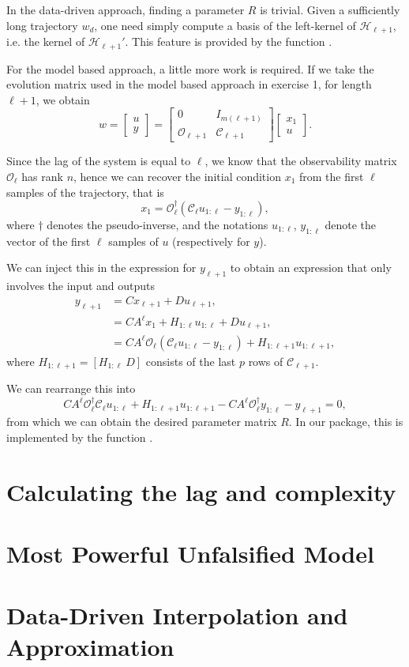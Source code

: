 \documentclass[11pt]{article}
\begin{document}
In the data-driven approach, finding a parameter $R$ is trivial. Given a sufficiently long trajectory $w_d$, one need simply compute a basis of the left-kernel of $\mathscr{H}_{\ell+1}$, i.e. the kernel of $\mathscr{H}_{\ell+1}'$. This feature is provided by the function .

For the model based approach, a little more work is required. If we take the evolution matrix used in the model based approach in exercise 1, for length $\ell + 1$, we obtain
$$ w = \begin{bmatrix}
  u \\
  y
\end{bmatrix} = \begin{bmatrix}
  0 & I_{m(\ell+1)} \\
  \mathscr{O}_{\ell+1} & \mathscr{C}_{\ell+1}
\end{bmatrix} \begin{bmatrix}
  x_1 \\
  u
\end{bmatrix}.$$

Since the lag of the system is equal to $\ell$, we know that the observability matrix $\mathscr{O}_\ell$ has rank $n$, hence we can recover the initial condition $x_1$ from the first $\ell$ samples of the trajectory, that is
$$ x_1 = \mathscr{O}_\ell^\dagger (\mathscr{C}_\ell u_{1:\ell} - y_{1:\ell}), $$
where $\dagger$ denotes the pseudo-inverse, and the notations $u_{1:\ell}$, $y_{1:\ell}$ denote the vector of the first $\ell$ samples of $u$ (respectively for $y$). 

We can inject this in the expression for $y_{\ell+1}$ to obtain an expression that only involves the input and outputs
\begin{align*}
  y_{\ell+1} &= Cx_{\ell+1} + Du_{\ell+1}, \\
   &= CA^\ell x_1 + H_{1:\ell} u_{1:\ell} + Du_{\ell+1}, \\
   &= CA^\ell \mathscr{O}_\ell (\mathscr{C}_\ell u_{1:\ell} - y_{1:\ell}) + H_{1:\ell+1} u_{1:\ell+1},
\end{align*}
where $H_{1:\ell+1} = [H_{1:\ell} ~D]$ consists of the last $p$ rows of $\mathscr{C}_{\ell+1}$.

We can rearrange this into 
$$ CA^\ell \mathscr{O}_\ell^\dagger \mathscr{C}_\ell u_{1:\ell} + H_{1:\ell+1} u_{1:\ell+1} - CA^\ell \mathscr{O}_\ell^\dagger y_{1:\ell} -y_{\ell+1} = 0,$$
from which we can obtain the desired parameter matrix $R$. In our package, this is implemented by the function .

\section{Calculating the lag and complexity}


\section{Most Powerful Unfalsified Model}

\section{Data-Driven Interpolation and Approximation}




\end{document}
